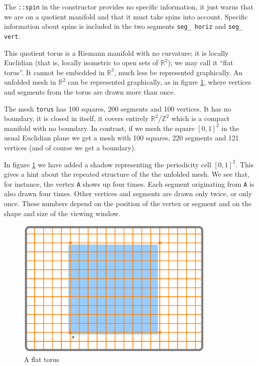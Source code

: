 The {\small\tt{}::spin} in the constructor {\small{} }
provides no specific information, it just warns {\maniFEM} that we are on a quotient manifold
and that it must take spins into account.
Specific information about spins is included in the two segments {\small\tt seg\_\,horiz}
and {\small\tt seg\_\,vert}.

This quotient torus is a Riemann manifold with no curvature; it is locally Euclidian
(that is, locally isometric to open sets of $ \mathbb{R}^2 $); we may call it ``flat torus''.
It cannot be embedded in $ \mathbb{R}^3 $, much less be represented graphically.
An unfolded mesh in $ \mathbb{R}^2 $ can be represented graphically,
as in figure \ref{\numb section 7.\numb fig 1}, where vertices and segments from the torus
are drawn more than once.

The mesh {\small\tt torus} has 100 squares, 200 segments and 100 vertices.
It has no boundary, it is closed in itself, it covers entirely $ \mathbb{R}^2/{\mathbb Z}^2 $
which is a compact manifold with no boundary.
In contrast, if we mesh the square $ [0,1]^2 $ in the usual Euclidian plane
we get a mesh with 100 squares, 220 segments and 121 vertices (and of course we get a boundary).

In figure \ref{\numb section 7.\numb fig 1} we have added a shadow representing
the periodicity cell $ [0,1]^2 $.
This gives a hint about the repeated structure of the the unfolded mesh.
We see that, for instance, the vertex {\small\tt A} shows up four times.
Each segment originating from {\small\tt A} is also drawn four times.
Other vertices and segments are drawn only twice, or only once.
These numbers depend on the position of the vertex or segment and on the shape and size
of the viewing window.

\begin{figure}[ht] \centering
  \includegraphics[width=96mm]{flat-torus-1.eps}
  \caption{A flat torus}
  \label{\numb section 7.\numb fig 1}
\end{figure}

